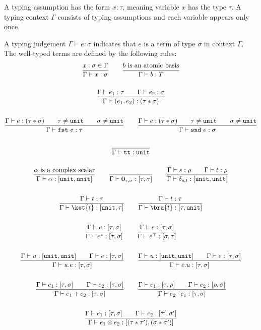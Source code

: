 \begin{definition}
  A typing assumption has the form $x : \tau$, meaning variable $x$ has the type $\tau$. A typing context $\Gamma$ consists of typing assumptions and each variable appears only once.

  A typing judgement $\Gamma \vdash e : \sigma$ indicates that $e$ is a term of type $\sigma$ in context $\Gamma$. The well-typed terms are defined by the following rules:
  \begin{gather*}
    \frac{x : \sigma \in \Gamma}{\Gamma \vdash x : \sigma}
    \qquad 
    \frac{b\ \textrm{is an atomic basis}}{\Gamma \vdash b : T}\\
    \\
    \frac{\Gamma \vdash e_1 : \tau \qquad \Gamma \vdash e_2 : \sigma}{\Gamma \vdash (e_1, e_2) : ( \tau * \sigma )} \\
    \\
    \frac{\Gamma \vdash e : ( \tau * \sigma ) \qquad \tau \neq \unit \qquad \sigma \neq \unit}{\Gamma \vdash \fst\ e : \tau}
    \qquad
    \frac{\Gamma \vdash e : ( \tau * \sigma ) \qquad \tau \neq \unit \qquad \sigma \neq \unit}{\Gamma \vdash \snd\ e : \sigma} \\
    \\
    \frac{}{\Gamma \vdash \utt : \unit}\\
    \\
    \frac{\alpha\ \textrm{is a complex scalar}}{\Gamma \vdash \alpha : [\unit, \unit]}
    \qquad
    \frac{}{\Gamma \vdash \mathbf{0}_{\tau, \sigma} : [\tau, \sigma]}
    \qquad
    \frac{\Gamma \vdash s : \rho \qquad \Gamma \vdash t : \rho}{\Gamma \vdash \delta_{s, t} : [\unit, \unit]}\\
    \\
    \frac{\Gamma \vdash t : \tau}{\Gamma \vdash \ket{t} : [\unit, \tau]}
    \qquad 
    \frac{\Gamma \vdash t : \tau}{\Gamma \vdash \bra{t} : [\tau, \unit]}\\
    \\
    \frac{\Gamma \vdash e : [\tau, \sigma]}{\Gamma \vdash e^* : [\tau, \sigma]}
    \qquad
    \frac{\Gamma \vdash e : [\tau, \sigma]}{\Gamma \vdash e^\top : [\sigma, \tau]} \\
    \\
    \frac{\Gamma \vdash u : [\unit, \unit] \qquad \Gamma \vdash e : [\tau, \sigma]}{\Gamma \vdash u.e : [\tau, \sigma]}
    \qquad
    \frac{\Gamma \vdash u : [\unit, \unit] \qquad \Gamma \vdash e : [\tau, \sigma]}{\Gamma \vdash e.u : [\tau, \sigma]}\\
    \\
    \frac{\Gamma \vdash e_1 : [\tau, \sigma] \qquad \Gamma \vdash e_2 : [\tau, \sigma] }{\Gamma \vdash e_1 + e_2 : [\tau, \sigma] }
    \qquad 
    \frac{\Gamma \vdash e_1 : [\tau, \rho] \qquad \Gamma \vdash e_2 : [\rho, \sigma] }{\Gamma \vdash e_2 \cdot e_1 : [\tau, \sigma] } \\
    \\
    \frac{\Gamma \vdash e_1 : [\tau, \sigma] \qquad \Gamma \vdash e_2 : [\tau', \sigma'] }{\Gamma \vdash e_1 \otimes e_2 : [(\tau * \tau'), (\sigma * \sigma')]}
  \end{gather*}
\end{definition}

